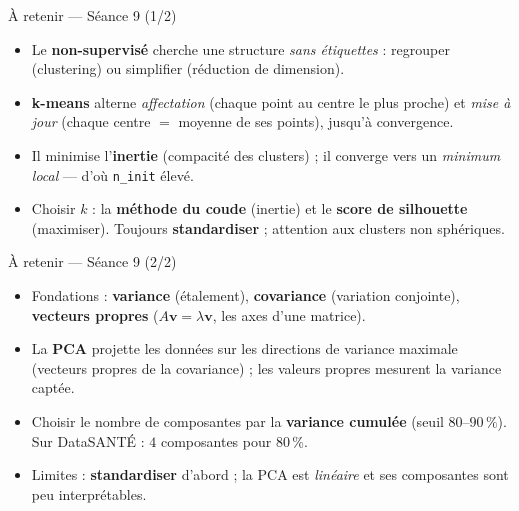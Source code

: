 \documentclass[aspectratio=169,11pt]{beamer}
\begin{document}
\begin{frame}{À retenir — Séance 9 (1/2)}
\begin{ucadret}[Le clustering]
\begin{itemize}\small
  \item Le \textbf{non-supervisé} cherche une structure \emph{sans étiquettes} : regrouper (clustering) ou simplifier (réduction de dimension).
  \item \textbf{k-means} alterne \emph{affectation} (chaque point au centre le plus proche) et \emph{mise à jour} (chaque centre $=$ moyenne de ses points), jusqu'à convergence.
  \item Il minimise l'\textbf{inertie} (compacité des clusters) ; il converge vers un \emph{minimum local} — d'où \texttt{n\_init} élevé.
  \item Choisir $k$ : la \textbf{méthode du coude} (inertie) et le \textbf{score de silhouette} (maximiser). Toujours \textbf{standardiser} ; attention aux clusters non sphériques.
\end{itemize}
\end{ucadret}
\end{frame}

\begin{frame}{À retenir — Séance 9 (2/2)}
\begin{ucadret}
\begin{itemize}\small
  \item Fondations : \textbf{variance} (étalement), \textbf{covariance} (variation conjointe), \textbf{vecteurs propres} ($A\mathbf{v} = \lambda\mathbf{v}$, les axes d'une matrice).
  \item La \textbf{PCA} projette les données sur les directions de variance maximale (vecteurs propres de la covariance) ; les valeurs propres mesurent la variance captée.
  \item Choisir le nombre de composantes par la \textbf{variance cumulée} (seuil $80$–$90\,\%$). Sur DataSANTÉ : $4$ composantes pour $80\,\%$.
  \item Limites : \textbf{standardiser} d'abord ; la PCA est \emph{linéaire} et ses composantes sont peu interprétables.
\end{itemize}
\end{ucadret}
\end{frame}
\end{document}
